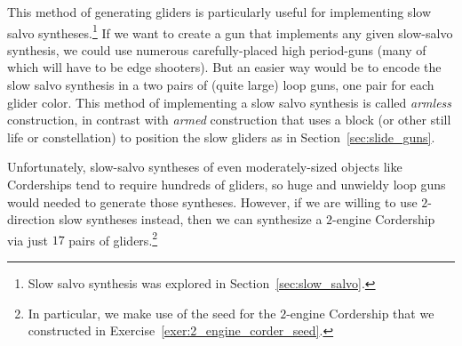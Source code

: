 This method of generating gliders is particularly useful for implementing slow salvo syntheses.\footnote{Slow salvo synthesis was explored in Section~\ref{sec:slow_salvo}.} If we want to create a gun that implements any given slow-salvo synthesis, we could use numerous carefully-placed high period-guns (many of which will have to be edge shooters). But an easier way would be to encode the slow salvo synthesis in a two pairs of (quite large) loop guns, one pair for each glider color. This method of implementing a slow salvo synthesis is called \emph{armless} construction, in contrast with \emph{armed} construction that uses a block (or other still life or constellation) to position the slow gliders as in Section~\ref{sec:slide_guns}.

Unfortunately, slow-salvo syntheses of even moderately-sized objects like Corderships tend to require hundreds of gliders, so huge and unwieldy loop guns would needed to generate those syntheses. However, if we are willing to use $2$-direction slow syntheses instead, then we can synthesize a $2$-engine Cordership via just $17$ pairs of gliders.\footnote{In particular, we make use of the seed for the $2$-engine Cordership that we constructed in Exercise~\ref{exer:2_engine_corder_seed}.}

